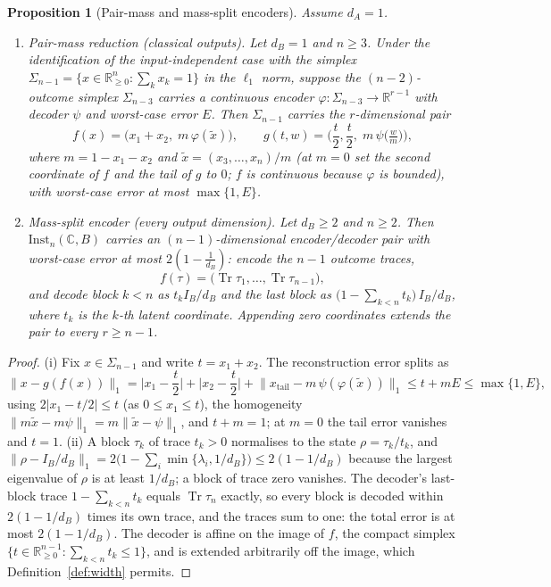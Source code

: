\documentclass[11pt,a4paper]{article}
\newtheorem{proposition}[theorem]{Proposition}
\newcommand{\Inst}{\mathrm{Inst}}
\newcommand{\Tr}{\operatorname{Tr}}
\begin{document}
\begin{proposition}[Pair-mass and mass-split encoders]
\label{prop:mass-split}
Assume $d_A=1$.
\begin{enumerate}[leftmargin=*,itemsep=2pt]
\item \emph{Pair-mass reduction (classical outputs).} Let $d_B=1$ and $n\ge3$. Under the
identification of the input-independent case with the simplex
$\Sigma_{n-1}=\{x\in\mathbb R^n_{\ge0}:\sum_kx_k=1\}$ in the $\ell_1$ norm, suppose the
$(n-2)$-outcome simplex $\Sigma_{n-3}$ carries a continuous encoder
$\varphi:\Sigma_{n-3}\to\mathbb R^{r-1}$ with decoder $\psi$ and worst-case error $E$.
Then $\Sigma_{n-1}$ carries the $r$-dimensional pair
\[
f(x)=\big(x_1+x_2,\;m\,\varphi(\tilde x)\big),\qquad
g(t,w)=\Big(\frac t2,\frac t2,\;m\,\psi\big(\tfrac{w}{m}\big)\Big),
\]
where $m=1-x_1-x_2$ and $\tilde x=(x_3,\dots,x_n)/m$ (at $m=0$ set the second
coordinate of $f$ and the tail of $g$ to $0$; $f$ is continuous because $\varphi$ is
bounded), with worst-case error at most $\max\{1,E\}$.
\item \emph{Mass-split encoder (every output dimension).} Let $d_B\ge2$ and $n\ge2$.
Then $\Inst_n(\mathbb C,B)$ carries an $(n-1)$-dimensional encoder/decoder pair with
worst-case error at most $2(1-\tfrac1{d_B})$: encode the $n-1$ outcome traces,
\[
f(\tau)=\big(\Tr\tau_1,\dots,\Tr\tau_{n-1}\big),
\]
and decode block $k<n$ as $t_kI_B/d_B$ and the last block as
$\big(1-\sum_{k<n}t_k\big)\,I_B/d_B$, where $t_k$ is the $k$-th latent coordinate.
Appending zero coordinates extends the pair to every $r\ge n-1$.
\end{enumerate}
\end{proposition}

\begin{proof}
(i) Fix $x\in\Sigma_{n-1}$ and write $t=x_1+x_2$. The reconstruction error splits as
\[
\|x-g(f(x))\|_1
=\Big|x_1-\frac t2\Big|+\Big|x_2-\frac t2\Big|
+\big\|x_{\mathrm{tail}}-m\,\psi(\varphi(\tilde x))\big\|_1
\le t+mE\le\max\{1,E\},
\]
using $2|x_1-t/2|\le t$ (as $0\le x_1\le t$), the homogeneity
$\|m\tilde x-m\psi\|_1=m\|\tilde x-\psi\|_1$, and $t+m=1$; at $m=0$ the tail error
vanishes and $t=1$. (ii) A block $\tau_k$ of trace $t_k>0$ normalises to the state
$\rho=\tau_k/t_k$, and
$\|\rho-I_B/d_B\|_1=2\big(1-\sum_i\min\{\lambda_i,1/d_B\}\big)\le2(1-1/d_B)$ because
the largest eigenvalue of $\rho$ is at least $1/d_B$; a block of trace zero vanishes.
The decoder's last-block trace $1-\sum_{k<n}t_k$ equals $\Tr\tau_n$ exactly, so every
block is decoded within $2(1-1/d_B)$ times its own trace, and the traces sum to one:
the total error is at most $2(1-1/d_B)$. The decoder is affine on the image of $f$,
the compact simplex $\{t\in\mathbb R^{n-1}_{\ge0}:\sum_{k<n}t_k\le1\}$, and is
extended arbitrarily off the image, which Definition~\ref{def:width} permits.
\end{proof}
\end{document}
